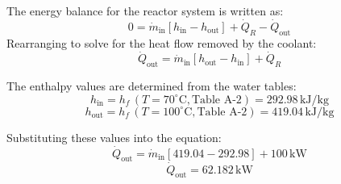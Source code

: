 The energy balance for the reactor system is written as:  
\[
0 = \dot{m}_{\text{in}} \left[ h_{\text{in}} - h_{\text{out}} \right] + \dot{Q}_R - \dot{Q}_{\text{out}}
\]  
Rearranging to solve for the heat flow removed by the coolant:  
\[
\dot{Q}_{\text{out}} = \dot{m}_{\text{in}} \left[ h_{\text{out}} - h_{\text{in}} \right] + \dot{Q}_R
\]  

The enthalpy values are determined from the water tables:  
\[
h_{\text{in}} = h_f \, (T = 70^\circ\text{C}, \text{Table A-2}) = 292.98 \, \text{kJ/kg}
\]  
\[
h_{\text{out}} = h_f \, (T = 100^\circ\text{C}, \text{Table A-2}) = 419.04 \, \text{kJ/kg}
\]  

Substituting these values into the equation:  
\[
\dot{Q}_{\text{out}} = \dot{m}_{\text{in}} \left[ 419.04 - 292.98 \right] + 100 \, \text{kW}
\]  
\[
\dot{Q}_{\text{out}} = 62.182 \, \text{kW}
\]